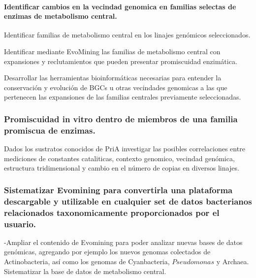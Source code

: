 \documentclass[12pt,twoside]{reedthesis}
\begin{document}
  \paragraph{Identificar cambios en la vecindad genomica en familias
  selectas de enzimas de metabolismo
  central.}\label{identificar-cambios-en-la-vecindad-genomica-en-familias-selectas-de-enzimas-de-metabolismo-central.}
  
  Identificar familias de metabolismo central en los linajes genómicos
  seleccionados.
  
  Identificar mediante EvoMining las familias de metabolismo central con
  expansiones y reclutamientos que pueden presentar promiscuidad
  enzimática.
  
  Desarrollar las herramientas bioinformáticas necesarias para entender la
  conservación y evolución de BGCs u otras vecindades genomicas a las que
  pertenecen las expansiones de las familias centrales previamente
  seleccionadas.
  
  \subsubsection{Promiscuidad in vitro dentro de miembros de una familia
  promiscua de
  enzimas.}\label{promiscuidad-in-vitro-dentro-de-miembros-de-una-familia-promiscua-de-enzimas.}
  
  Dados los sustratos conocidos de PriA investigar las posibles
  correlaciones entre mediciones de constantes cataliticas, contexto
  genomico, vecindad genómica, estructura tridimensional y cambio en el
  número de copias en diversos linajes.
  
  \subsubsection{Sistematizar Evomining para convertirla una plataforma
  descargable y utilizable en cualquier set de datos bacterianos
  relacionados taxonomicamente proporcionados por el
  usuario.}\label{sistematizar-evomining-para-convertirla-una-plataforma-descargable-y-utilizable-en-cualquier-set-de-datos-bacterianos-relacionados-taxonomicamente-proporcionados-por-el-usuario.}
  
  -Ampliar el contenido de Evomining para poder analizar nuevas bases de
  datos genómicas, agregando por ejemplo los nuevos genomas colectados de
  Actinobacteria, así como los genomas de Cyanbacteria, \(Pseudomonas\) y
  Archaea.\\
  Sistematizar la base de datos de metabolismo central.
  
\end{document}
